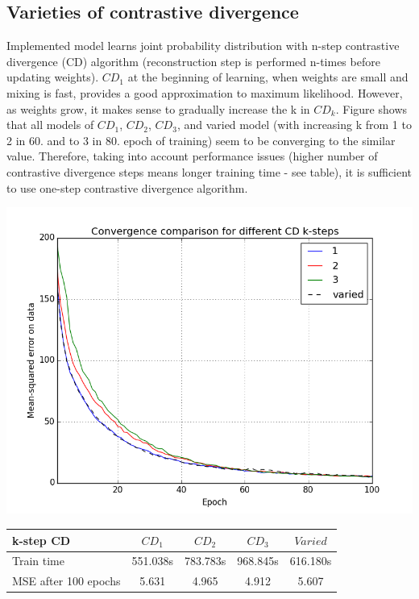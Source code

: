\documentclass[a4paper]{scrartcl}
\begin{document}
\subsection{Varieties of contrastive divergence}
Implemented model learns joint probability distribution with n-step contrastive divergence (CD) algorithm (reconstruction step is performed n-times before updating weights). $CD_1$ at the beginning of learning, when weights are small and mixing is fast, provides a good approximation to maximum likelihood. However, as weights grow, it makes sense to gradually increase the k in $CD_k$.
Figure shows that all models of $CD_1$, $CD_2$, $CD_3$, and varied model (with increasing k from 1 to 2 in 60. and to 3 in 80. epoch of training) seem to be converging to the similar value. Therefore, taking into account performance issues (higher number of contrastive divergence steps means longer training time - see table), it is sufficient to use one-step contrastive divergence algorithm.
\begin{center}
\includegraphics[width=15cm]{images/CDk_var.png}
\end{center}
\hspace{1cm}
\begin{tabular}{|l||c|c|c|c|} \hline
k-step CD & $CD_1$ & $CD_2$ & $CD_3$ & $Varied$
\\ \hline
Train time & 551.038s & 783.783s & 968.845s & 616.180s
\\ \hline
MSE after 100 epochs & 5.631 & 4.965 & 4.912 & 5.607
\\ \hline \end{tabular}
\end{document}
